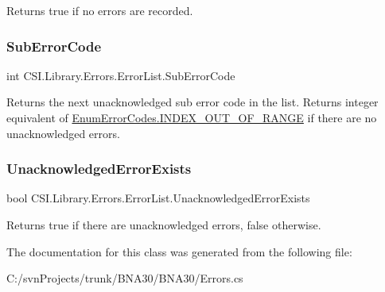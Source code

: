 Returns true if no errors are recorded. 

\mbox{\label{class_c_s_i_1_1_library_1_1_errors_1_1_error_list_acd5490889a4102649bc9c22ce11958b7}} 
\subsubsection{\texorpdfstring{SubErrorCode}{SubErrorCode}}
{\footnotesize\ttfamily int C\+S\+I.\+Library.\+Errors.\+Error\+List.\+Sub\+Error\+Code\hspace{0.3cm}{\ttfamily [get]}}



Returns the next unacknowledged sub error code in the list. Returns integer equivalent of \mbox{\hyperlink{namespace_c_s_i_1_1_library_1_1_errors_a5534735de1ef2256eb4c52c7440e30d7a577cf42cc2eae1cffef0f749c6c08787}{Enum\+Error\+Codes.\+I\+N\+D\+E\+X\+\_\+\+O\+U\+T\+\_\+\+O\+F\+\_\+\+R\+A\+N\+GE}} if there are no unacknowledged errors. 

\mbox{\label{class_c_s_i_1_1_library_1_1_errors_1_1_error_list_ac89e2547e9f76d9ba7c8c3a10ab40dcd}} 
\subsubsection{\texorpdfstring{UnacknowledgedErrorExists}{UnacknowledgedErrorExists}}
{\footnotesize\ttfamily bool C\+S\+I.\+Library.\+Errors.\+Error\+List.\+Unacknowledged\+Error\+Exists\hspace{0.3cm}{\ttfamily [get]}}



Returns true if there are unacknowledged errors, false otherwise. 



The documentation for this class was generated from the following file\+:\begin{DoxyCompactItemize}
\item 
C\+:/svn\+Projects/trunk/\+B\+N\+A30/\+B\+N\+A30/Errors.\+cs\end{DoxyCompactItemize}

